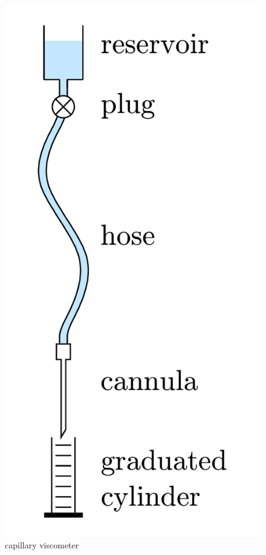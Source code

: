 \begin{figure}
\begin{minipage}{.3\textwidth}
    \includegraphics[scale=.25]{Bilder/kanuelen.pdf}
    \caption{capillary viscometer}
    \label{fig:cap}
    \end{minipage}
    \hspace{5mm}

\end{figure}

